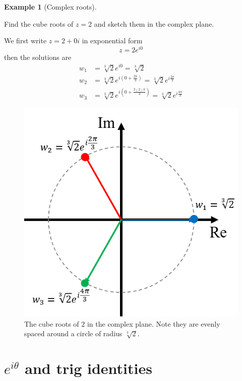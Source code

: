 \documentclass[
]{book}
\theoremstyle{definition}
\theoremstyle{definition}
\newtheorem{example}{Example}[chapter]
\theoremstyle{definition}
\theoremstyle{definition}
\theoremstyle{remark}
\begin{document}
\begin{example}[Complex roots]
\protect\hypertarget{exm:complexroots}{}\label{exm:complexroots}

Find the cube roots of \(z=2\) and sketch them in the complex plane.

We first write \(z=2+0i\) in exponential form
\[z=2e^{i0}\]
then the solutions are
\begin{align*}
w_1&=\sqrt[3]{2}e^{i0}=\sqrt[3]{2}\\
w_2&=\sqrt[3]{2}e^{i(0+\frac{2\pi}{3})}=\sqrt[3]{2}e^{i\frac{2\pi}{3}}\\
w_3&=\sqrt[3]{2}e^{i(0+\frac{2(2)\pi}{3})}=\sqrt[3]{2}e^{i\frac{4\pi}{3}}
\end{align*}

\begin{figure}
\includegraphics{figures/complexroots} \caption{The cube roots of $2$ in the complex plane. Note they are evenly spaced around a circle of radius $\sqrt[3]{2}$.}\label{fig:complexrootsexmp}
\end{figure}

\end{example}

\hypertarget{eitheta-and-trig-identities}{%
\section{\texorpdfstring{\(e^{i\theta}\) and trig identities}{e\^{}\{i\textbackslash theta\} and trig identities}}\label{eitheta-and-trig-identities}}
\end{document}

